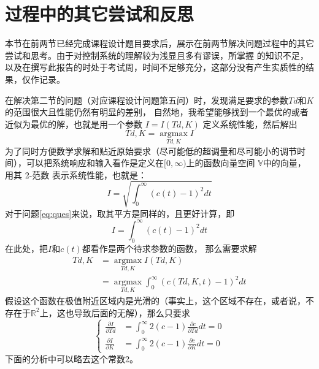 \documentclass[../report.tex]{subfiles}
\begin{document}
\section{过程中的其它尝试和反思}

本节在前两节已经完成课程设计题目要求后，展示在前两节解决问题过程中的其它尝试和思考。由于对控制系统的理解较为浅显且多有谬误，所掌握
的知识不足，以及在撰写此报告的时处于考试周，时间不足够充分，这部分没有产生实质性的结果，仅作记录。

在解决第二节的问题（对应课程设计问题第五问）时，发现满足要求的参数$Td$和$K$的范围很大且性能仍然有明显的差别，
自然地，我希望能够找到一个最优的或者近似为最优的解，也就是用一个参数 $I=I(Td,K)$ 定义系统性能，然后解出
\begin{equation}
   Td, K =  \mathop{\arg\max}\limits_{Td,K} I \label{eq:ques}
\end{equation}
为了同时方便数学求解和贴近原始要求（尽可能低的超调量和尽可能小的调节时间），可以把系统响应和输入看作是定义在$[0,\infty)$上的函数向量空间
$\mathbb{V} $中的向量，用其 2-范数 表示系统性能，也就是：
\begin{equation}
    I = \sqrt{\int_{0}^{\infty} (c(t)-1)^2 dt}
\end{equation}
对于问题\ref{eq:ques}来说，取其平方是同样的，且更好计算，即
\begin{equation}
    I = \int_{0}^{\infty} (c(t)-1)^2 dt \label{eq:ex_int}
\end{equation}
在此处，把$I$和$c(t)$都看作是两个待求参数的函数， 那么需要求解
\begin{align}
   Td, K &=  \mathop{\arg\max}\limits_{Td,K} I(Td,K) \\&= \mathop{\arg\max}\limits_{Td,K}\int_{0}^{\infty} (c(Td, K, t)-1)^2 dt
\end{align}
假设这个函数在极值附近区域内是光滑的（事实上，这个区域不存在，或者说，不存在于$\mathbb{R} ^2$上，这也导致后面的无解），那么只要求
\begin{equation}
    \begin{cases}
        \frac{\partial I}{\partial Td} &= \int_{0}^{\infty} 2(c-1) \frac{\partial c}{\partial Td} dt =0\\
        \frac{\partial I}{\partial K} &= \int_{0}^{\infty} 2(c-1) \frac{\partial c}{\partial K} dt =0
    \end{cases}
\end{equation}
下面的分析中可以略去这个常数2。
\end{document}
